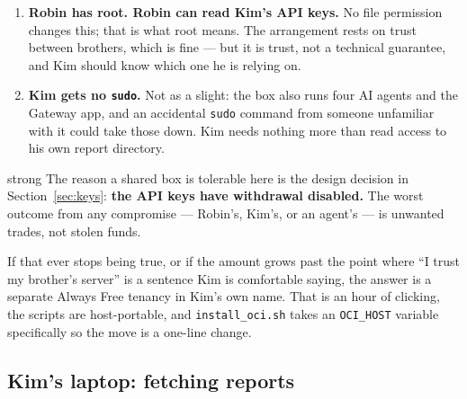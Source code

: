 \documentclass[11pt,a4paper]{article}
\begin{document}
\begin{enumerate}[leftmargin=2em]
    \item \textbf{Robin has root. Robin can read Kim's API keys.}
          No file permission changes this; that is what root means.
          The arrangement rests on trust between brothers, which is
          fine --- but it is trust, not a technical guarantee, and Kim
          should know which one he is relying on.
    \item \textbf{Kim gets no \texttt{sudo}.} Not as a slight: the box
          also runs four AI agents and the Gateway app, and an
          accidental \texttt{sudo} command from someone unfamiliar with
          it could take those down. Kim needs nothing more than read
          access to his own report directory.
\end{enumerate}

\vspace{0.5em}
\begin{resultbox}{strong}
The reason a shared box is tolerable here is the design decision in
Section~\ref{sec:keys}: \textbf{the API keys have withdrawal disabled.}
The worst outcome from any compromise --- Robin's, Kim's, or an
agent's --- is unwanted trades, not stolen funds.

\vspace{0.4em}
If that ever stops being true, or if the amount grows past the point
where ``I trust my brother's server'' is a sentence Kim is comfortable
saying, the answer is a separate Always Free tenancy in Kim's own name.
That is an hour of clicking, the scripts are host-portable, and
\texttt{install\_oci.sh} takes an \texttt{OCI\_HOST} variable
specifically so the move is a one-line change.
\end{resultbox}

\subsection{Kim's laptop: fetching reports}
\end{document}
